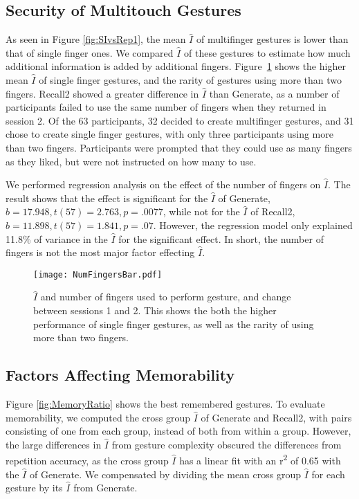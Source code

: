\documentclass{sig-alternate-10pt}
\begin{document}
\newpage
\subsection{Security of Multitouch Gestures}







  As seen in Figure \ref{fig:SIvsRep1}, the mean $\hat{I}$ of multifinger gestures is  lower than that of single finger ones. We compared $\hat{I}$ of these gestures to estimate how much additional information is added by additional fingers. Figure~\ref{fig:barFingers} shows the higher mean $\hat{I}$ of single finger gestures, and the rarity of gestures using more than two fingers. Recall2 showed a greater difference in  $\hat{I}$ than Generate, as a number of participants failed to use the same number of fingers when they returned in session 2. Of the 63 participants, 32 decided to create multifinger gestures, and 31 chose to create single finger gestures, with only three participants using more than two fingers. Participants were prompted that they could use as many fingers as they liked, but were not instructed on how many to use.

 We performed regression analysis on the effect of the number of fingers  on  $\hat{I}$. The result shows that the effect is significant for the  $\hat{I}$ of Generate, $b=17.948, t(57)=2.763, p=.0077$, while not for the  $\hat{I}$ of Recall2, $b=11.898, t(57)=1.841, p=.07$. However, the regression model only explained 11.8\% of variance in the  $\hat{I}$ for the significant effect. In short, the number of fingers is not the most major factor effecting $\hat{I}$.

  \begin{figure}[!h]
  \centering
  \texttt{[image: NumFingersBar.pdf]}
  \caption{ $\hat{I}$ and number of fingers used to perform gesture, and change between sessions 1 and 2. This shows the both the higher performance of single finger gestures, as well as the rarity of using more than two fingers.}
  \label{fig:barFingers}
  \end{figure}

\subsection{Factors Affecting Memorability}



Figure \ref{fig:MemoryRatio} shows the best remembered gestures. To evaluate memorability, we computed the cross group $\hat{I}$ of Generate and Recall2, with pairs consisting of one from each group, instead of both from within a group. However, the large differences in $\hat{I}$ from gesture complexity obscured the differences from repetition accuracy, as the cross group $\hat{I}$ has a linear fit with an r\textsuperscript{2} of 0.65 with the $\hat{I}$ of Generate. We compensated by dividing the mean cross group $\hat{I}$ for each gesture by its $\hat{I}$ from Generate. 
\end{document}
